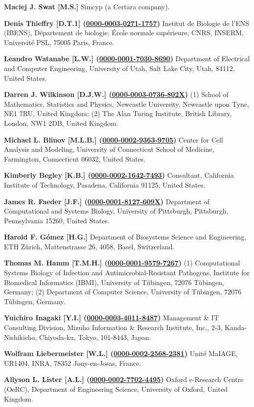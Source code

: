 \documentclass{sbml-paper}
\newcommand{\orcid}[1]{\href{https://orcid.org/#1}{#1}}
\begin{document}
\textbf{Maciej J. Swat [M.S.]} Simcyp (a Certara company).

\textbf{Denis Thieffry [D.T.1] (\orcid{0000-0003-0271-1757})} Institut de Biologie de l'ENS (IBENS), Département de biologie, École normale supérieure, CNRS, INSERM, Université PSL, 75005 Paris, France.

\textbf{Leandro Watanabe [L.W.] (\orcid{0000-0001-7030-8690})} Department of Electrical and Computer Engineering,  University of Utah, Salt Lake City, Utah, 84112, United States.

\textbf{Darren J. Wilkinson [D.J.W.] (\orcid{0000-0003-0736-802X})} (1) School of Mathematics, Statistics and Physics, Newcastle University, Newcastle upon Tyne, NE1 7RU, United Kingdom; (2) The Alan Turing Institute, British Library, London, NW1 2DB, United Kingdom.

\textbf{Michael L. Blinov [M.L.B.] (\orcid{0000-0002-9363-9705})} Center for Cell Analysis and Modeling, University of Connecticut School of Medicine, Farmington, Connecticut 06032, United States.

\textbf{Kimberly Begley [K.B.] (\orcid{0000-0002-1642-7493})} Consultant, California Institute of Technology, Pasadena, California 91125, United States.

\textbf{James R. Faeder [J.F.] (\orcid{0000-0001-8127-609X})} Department of Computational and Systems Biology, University of Pittsburgh, Pittsburgh, Pennsylvania 15260, United States.

\textbf{Harold F. Gómez [H.G.]} Department of Biosystems Science and Engineering, ETH Zürich, Mattenstrasse 26, 4058, Basel, Switzerland.

\textbf{Thomas M. Hamm [T.M.H.] (\orcid{0000-0001-9579-7267})} (1) Computational Systems Biology of Infection and Antimicrobial-Resistant Pathogens, Institute for Biomedical Informatics (IBMI), University of Tübingen, 72076 Tübingen, Germany; (2) Department of Computer Science, University of Tübingen, 72076 Tübingen, Germany.

\textbf{Yuichiro Inagaki [Y.I.] (\orcid{0000-0003-4011-8487})} Management \& IT Consulting Division, Mizuho Information \& Research Institute, Inc., 2-3, Kanda-Nishikicho, Chiyoda-ku, Tokyo, 101-8443, Japan.

\textbf{Wolfram Liebermeister [W.L.] (\orcid{0000-0002-2568-2381})} Unité MaIAGE, UR1404, INRA, 78352 Jouy-en-Josas, France.

\textbf{Allyson L. Lister [A.L.] (\orcid{0000-0002-7702-4495})} Oxford e-Research Centre (OeRC), Department of Engineering Science, University of Oxford, United Kingdom.
\end{document}
